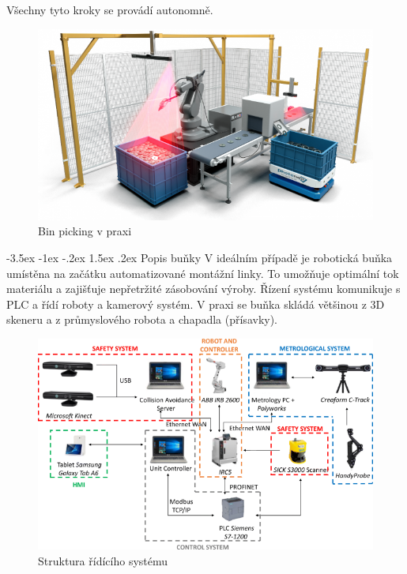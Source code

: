 \documentclass[a4paper,11pt]{article}
\makeatletter
\theoremstyle{definition}
\renewcommand\section{\@startsection {section}{1}{\z@}%
                                   {-3.5ex \@plus -1ex \@minus -.2ex}%
                                   {1.5ex \@plus.2ex}%
                                   {\large\bfseries}}
\makeatother
\begin{document}
Všechny tyto kroky se provádí autonomně. 
\cite{atria} 

\begin{figure}[h]
\begin{center}
\includegraphics[scale=0.5]{image/binpicking.png}
\caption{Bin picking v praxi \cite{sodavision}}
\label{fig:1}
\end{center}
\end{figure}
\newpage
\section{Popis buňky}
\label{sec:2}
V ideálním případě je robotická buňka umístěna na začátku automatizované montážní linky. To umožňuje optimální tok materiálu a zajišťuje nepřetržité zásobování výroby. Řízení systému komunikuje s PLC a řídí roboty a kamerový systém. V praxi se buňka skládá většinou z 3D skeneru a z průmyslového robota a chapadla (přísavky). 
\begin{figure}[h]
\begin{center}
\includegraphics[scale=0.5]{image/descriptionbinpickingcell.png}
\caption{Struktura řídícího systému}
\label{fig:2}
\end{center}
\end{figure}
\end{document}
